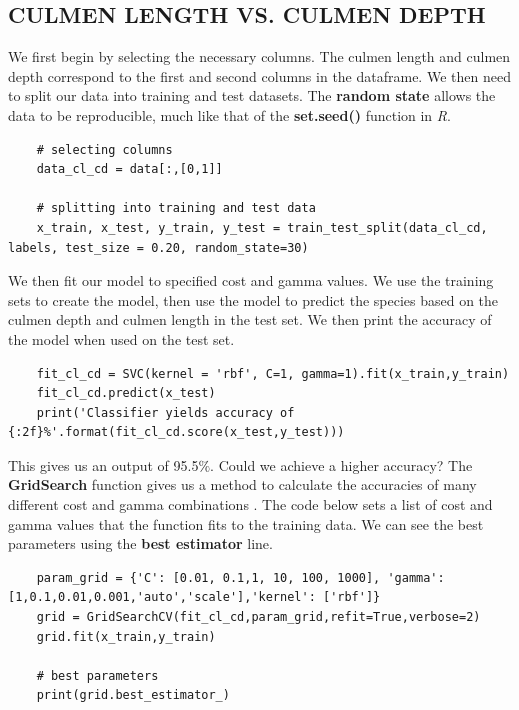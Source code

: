 \documentclass[12pt]{article}
\begin{document}
\subsection{CULMEN LENGTH VS. CULMEN DEPTH}

We first begin by selecting the necessary columns. The culmen length and culmen depth correspond to the first and second columns in the dataframe. We then need to split our data into training and test datasets. The \textbf{random state} allows the data to be reproducible, much like that of the \textbf{set.seed()} function in \textit{R}.

\begin{verbatim}
    # selecting columns
    data_cl_cd = data[:,[0,1]]

    # splitting into training and test data
    x_train, x_test, y_train, y_test = train_test_split(data_cl_cd, labels, test_size = 0.20, random_state=30)
\end{verbatim}

We then fit our model to specified cost and gamma values. We use the training sets to create the model, then use the model to predict the species based on the culmen depth and culmen length in the test set. We then print the accuracy of the model when used on the test set.

\begin{verbatim}
    fit_cl_cd = SVC(kernel = 'rbf', C=1, gamma=1).fit(x_train,y_train)
    fit_cl_cd.predict(x_test)
    print('Classifier yields accuracy of {:2f}%'.format(fit_cl_cd.score(x_test,y_test)))   
\end{verbatim}

This gives us an output of 95.5\(\%\). Could we achieve a higher accuracy? The \textbf{GridSearch} function gives us a method to calculate the accuracies of many different cost and gamma combinations \cite{svm_python_tuning}. The code below sets a list of cost and gamma values that the function fits to the training data. We can see the best parameters using the \textbf{best estimator} line.

\begin{verbatim}
    param_grid = {'C': [0.01, 0.1,1, 10, 100, 1000], 'gamma': [1,0.1,0.01,0.001,'auto','scale'],'kernel': ['rbf']}
    grid = GridSearchCV(fit_cl_cd,param_grid,refit=True,verbose=2)
    grid.fit(x_train,y_train)

    # best parameters
    print(grid.best_estimator_)
\end{verbatim}
\end{document}
